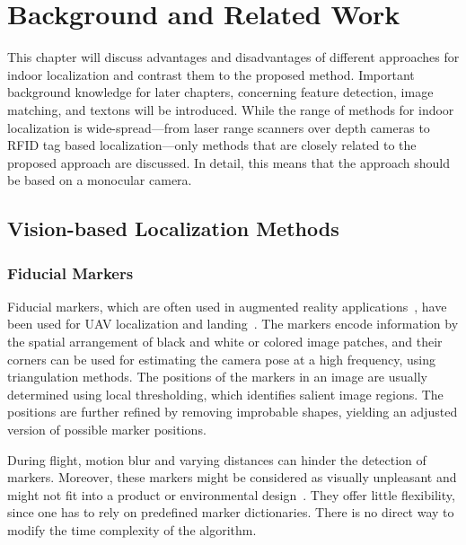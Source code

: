 \chapter{Background and Related Work}
\label{chap:relatedwork}

This chapter will discuss advantages and disadvantages of different approaches for indoor localization and
contrast them to the proposed method. Important
background knowledge for later chapters, concerning feature detection,
image matching, and textons will be introduced. While the range of methods for indoor localization is wide-spread---from laser range scanners over depth cameras to RFID tag based localization---only methods that are closely related to the proposed approach are discussed. In detail, this means that the approach should be based on a monocular camera.

\section{Vision-based Localization Methods}

\subsection{Fiducial Markers}
\label{sec:fiducialmarkers}

Fiducial markers, which are often used in augmented reality
applications~\cite{kato1999marker,garrido2014automatic}, have been
used for UAV localization and
landing~\cite{eberli2011vision,bebop2015}.
The markers encode information by the spatial arrangement of
black and white or colored image patches, and their corners can be
used for estimating the camera pose at a high frequency, using
triangulation methods. The positions of the markers in
an image are usually determined using local thresholding, which identifies salient image
regions. The positions are further refined by removing improbable shapes,
yielding an adjusted version of possible marker positions.

During flight, motion blur and varying distances can hinder the
detection of markers. Moreover, these markers might be considered as
visually unpleasant and might not fit into a product or environmental
design~\cite{chu2013halftone}. They offer little
flexibility, since one has to rely on predefined marker dictionaries.
There is no direct way to modify the time complexity of the algorithm.


